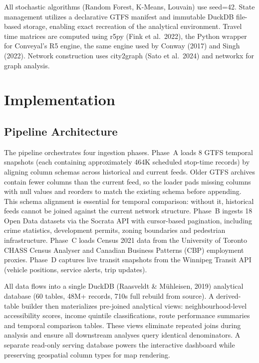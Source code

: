 \documentclass[11pt]{article}
\begin{document}
All stochastic algorithms (Random Forest, K-Means, Louvain) use seed=42. State management utilizes a declarative GTFS manifest and immutable DuckDB file-based storage, enabling exact recreation of the analytical environment. Travel time matrices are computed using r5py (Fink et al.\ 2022), the Python wrapper for Conveyal's R5 engine, the same engine used by Conway (2017) and Singh (2022). Network construction uses city2graph (Sato et al.\ 2024) and networkx for graph analysis.

\section{Implementation}

\subsection{Pipeline Architecture}

The pipeline orchestrates four ingestion phases. Phase~A loads 8 GTFS temporal snapshots (each containing approximately 464K scheduled stop-time records) by aligning column schemas across historical and current feeds. Older GTFS archives contain fewer columns than the current feed, so the loader pads missing columns with null values and reorders to match the existing schema before appending. This schema alignment is essential for temporal comparison: without it, historical feeds cannot be joined against the current network structure. Phase~B ingests 18 Open Data datasets via the Socrata API with cursor-based pagination, including crime statistics, development permits, zoning boundaries and pedestrian infrastructure. Phase~C loads Census 2021 data from the University of Toronto CHASS Census Analyser and Canadian Business Patterns (CBP) employment proxies. Phase~D captures live transit snapshots from the Winnipeg Transit API (vehicle positions, service alerts, trip updates).

All data flows into a single DuckDB (Raasveldt \& M\"uhleisen, 2019) analytical database (60 tables, 48M+ records, 710s full rebuild from source). A derived-table builder then materializes pre-joined analytical views: neighbourhood-level accessibility scores, income quintile classifications, route performance summaries and temporal comparison tables. These views eliminate repeated joins during analysis and ensure all downstream analyses query identical denominators. A separate read-only serving database powers the interactive dashboard while preserving geospatial column types for map rendering.
\end{document}
